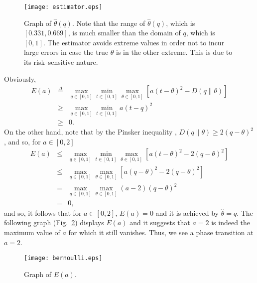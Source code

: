 \documentclass[11pt,epsf]{article}
\newcommand {\dfn} {\stackrel{\Delta} {=}}
\newcommand{\ct}{\hat{\theta}}
\begin{document}
\begin{figure}[h!t!b!]
\centering
\texttt{[image: estimator.eps]}
\caption{\small Graph of $\ct(q)$. Note that the range of $\ct(q)$, which is
$[0.331,0.669]$, is much smaller
than the domain of $q$, which is $[0,1]$. The estimator avoids extreme values
in order not to incur large errors in case the true $\theta$ is in the other
extreme. This is due
to its risk--sensitive nature.}
\label{est}
\end{figure}

Obviously,
\begin{eqnarray}
E(a)&\dfn&\max_{q\in[0,1]}\min_{t\in[0,1]}\max_{\theta\in[0,1]}
\left[a (t-\theta)^2-D(q\|\theta)\right]\\
&\ge&\max_{q\in[0,1]}\min_{t\in[0,1]} a (t-q)^2\\
&\ge& 0.
\end{eqnarray}
On the other hand,
note that by the Pinsker inequality \cite{CK81}, 
$D(q\|\theta)\ge 2(q-\theta)^2$, and so,
for $a\in[0,2]$
\begin{eqnarray}
E(a)&\le&\max_{q\in[0,1]}\min_{t\in[0,1]}\max_{\theta\in[0,1]}
\left[a (t-\theta)^2-2(q-\theta)^2\right]\\
&\le&\max_{q\in[0,1]}\max_{\theta\in[0,1]}
\left[a (q-\theta)^2-2(q-\theta)^2\right]\\
&=&\max_{q\in[0,1]}\max_{\theta\in[0,1]}
(a-2)(q-\theta)^2\\
&=&0,
\end{eqnarray}
and so, it follows that for $a\in[0,2]$, $E(a)=0$
and it is achieved by
$\ct=q$. The following graph (Fig.\ \ref{errorexp}) displays $E(a)$
and it suggests
that $a=2$ is indeed the maximum value of $a$ for which
it still vanishes. Thus, we see a phase transition at $a=2$.

\begin{figure}[h!t!b!]
\centering
\texttt{[image: bernoulli.eps]}
\caption{\small Graph of $E(a)$.}
\label{errorexp}
\end{figure}
\end{document}
